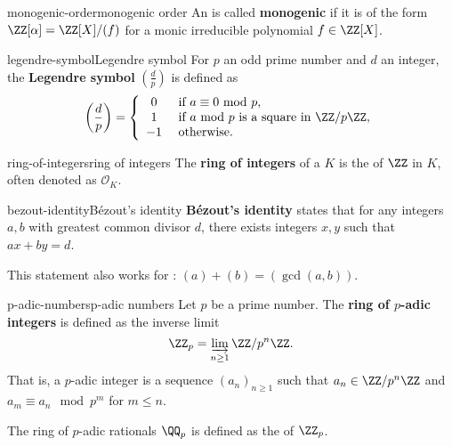 \begin{topic}{monogenic-order}{monogenic order}
    An  is called \textbf{monogenic} if it is of the form $\ZZ[\alpha] = \ZZ[X] / (f)$ for a monic irreducible polynomial $f \in \ZZ[X]$.
\end{topic}

\begin{topic}{legendre-symbol}{Legendre symbol}
    For $p$ an odd prime number and $d$ an integer, the \textbf{Legendre symbol} $\left(\tfrac{d}{p}\right)$ is defined as
    \[ \left(\frac{d}{p}\right) = \left\{ \begin{array}{cl}
        0 & \text{ if $a \equiv 0 \text{ mod } p$} , \\
        1 & \text{ if $a \text{ mod } p$ is a square in $\ZZ/p\ZZ$} ,  \\
        -1 & \text{ otherwise} .
    \end{array} \right. \]
\end{topic}

\begin{topic}{ring-of-integers}{ring of integers}
    The \textbf{ring of integers} of a  $K$ is the  of $\ZZ$ in $K$, often denoted as $\mathcal{O}_K$. %
\end{topic}

\begin{topic}{bezout-identity}{Bézout's identity}
    \textbf{Bézout's identity} states that for any integers $a, b$ with greatest common divisor $d$, there exists integers $x, y$ such that $ax + by = d$.
    
    This statement also works for : $(a) + (b) = (\gcd(a, b))$.
\end{topic}

\begin{topic}{p-adic-numbers}{p-adic numbers}
    Let $p$ be a prime number. The \textbf{ring of $p$-adic integers} is defined as the inverse limit
    \[ \ZZ_p = \varinjlim_{n \ge 1} \ZZ / p^n \ZZ . \]
    That is, a $p$-adic integer is a sequence $(a_n)_{n \ge 1}$ such that $a_n \in \ZZ / p^n \ZZ$ and $a_m \equiv a_n \mod p^m$ for $m \le n$.
    
    The ring of $p$-adic rationals $\QQ_p$ is defined as the  of $\ZZ_p$.
\end{topic}

